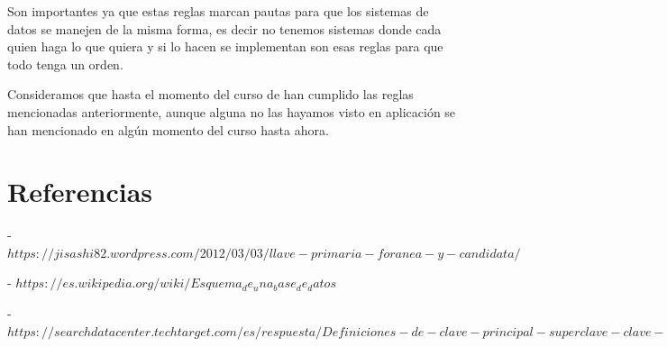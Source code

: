 \documentclass[12pt, letterpaper]{article}
\begin{document}
  Son importantes ya que estas reglas marcan pautas para que los sistemas de datos 
  se manejen de la misma forma, es decir no tenemos sistemas donde cada quien haga 
  lo que quiera y si lo hacen se implementan son esas reglas para que todo tenga un 
  orden. \vspace{.3cm}

  Consideramos que hasta el momento del curso de han cumplido las reglas mencionadas 
  anteriormente, aunque alguna no las hayamos visto en aplicación se han mencionado 
  en algún momento del curso hasta ahora. 


  \section{Referencias}

    - $https://jisashi82.wordpress.com/2012/03/03/llave-primaria-foranea-y-candidata/$ \vspace{.3cm}

    - $https://es.wikipedia.org/wiki/Esquema_de_una_base_de_datos$ \vspace{.3cm}

    - $https://searchdatacenter.techtarget.com/es/respuesta/Definiciones-de-clave-principal-superclave-clave-foranea-y-clave-candidata-en-el-DBMS$
\end{document}
